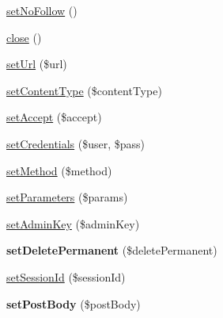 \begin{DoxyCompactItemize}
\item 
\hyperlink{class_rest_client_ae68c8161e48a57266e613b1346b8e54d}{set\+No\+Follow} ()
\item 
\hyperlink{class_rest_client_aa69c8bf1f1dcf4e72552efff1fe3e87e}{close} ()
\item 
\hyperlink{class_rest_client_a0b6d0c531aa70b1811b166299edab8d0}{set\+Url} (\$url)
\item 
\hyperlink{class_rest_client_a945b1a5744b810fcb31a05f827356cfa}{set\+Content\+Type} (\$content\+Type)
\item 
\hyperlink{class_rest_client_a44b73d734682a05093f9670c0dd82e66}{set\+Accept} (\$accept)
\item 
\hyperlink{class_rest_client_a730022ea49d1c11645ac6fec76f8477a}{set\+Credentials} (\$user, \$pass)
\item 
\hyperlink{class_rest_client_a643c65610f8b3179a8c147cab7cbb652}{set\+Method} (\$method)
\item 
\hyperlink{class_rest_client_ad8b2e26e67d9f58134fd5854b8b4e8e6}{set\+Parameters} (\$params)
\item 
\hyperlink{class_rest_client_a0111879efe3ee6fd3f8a645470ec049e}{set\+Admin\+Key} (\$admin\+Key)
\item 
\hypertarget{class_rest_client_a681d3fe3e0e6bcb0c0b085c376992991}{{\bfseries set\+Delete\+Permanent} (\$delete\+Permanent)}\label{class_rest_client_a681d3fe3e0e6bcb0c0b085c376992991}

\item 
\hyperlink{class_rest_client_ace8bf79f08c5588b7b15f2fc69386560}{set\+Session\+Id} (\$session\+Id)
\item 
\hypertarget{class_rest_client_ae7a8dfd04fbb11e7ac59eb320325ccea}{{\bfseries set\+Post\+Body} (\$post\+Body)}\label{class_rest_client_ae7a8dfd04fbb11e7ac59eb320325ccea}

\end{DoxyCompactItemize}
